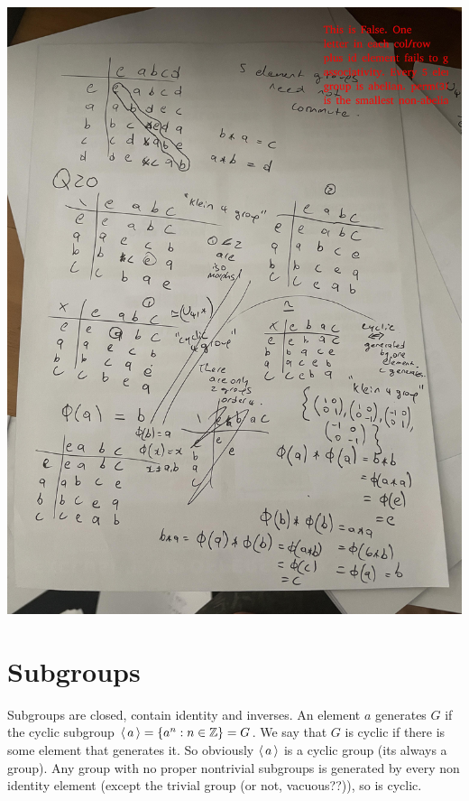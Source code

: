 \begin{center}
\includegraphics[scale=0.3, angle=-0]{fig/IMG_7284.jpeg}
\end{center}
\section*{Subgroups}
Subgroups are closed, contain identity and inverses. An element $a$ generates $G$ if
the cyclic subgroup $\operatorname{\langle} a \operatorname{\rangle} = \{ a^n : n \in \operatorname{\mathbb{Z}} \} = G$. We say that $G$ is cyclic if there is some element that generates it.
So obviously $\operatorname{\langle} a \operatorname{\rangle}$ is a cyclic group (its always a group). Any group with no proper nontrivial subgroups is generated by every
non identity element (except the trivial group (or not, vacuous??)), so is cyclic.
\newpage{}
